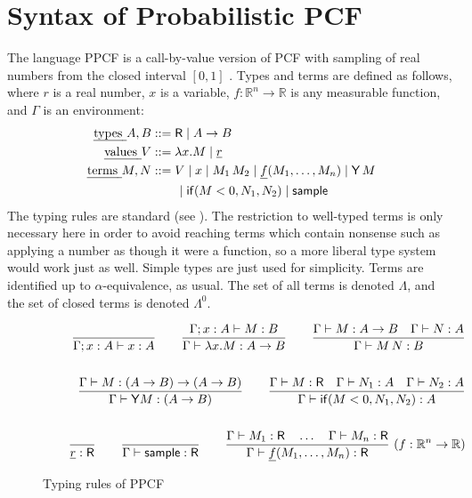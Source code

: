 \section{Syntax of Probabilistic PCF}
\label{sec:PPCF}

The language PPCF is a call-by-value version of PCF with sampling of real numbers from the closed interval $[0,1]$ \cite{Ehrhard2018c,DBLP:journals/pacmpl/EhrhardPT18,MakOPW21}.
Types and terms are defined as follows, where $r$ is a real number, $x$ is a variable, $f : \mathbb{R}^n \to \mathbb{R}$ is any measurable function, and $\Gamma$ is an environment:
\begin{align*}
  \text{\em types } A, B &::= \textsf{R}  \mid  A \to B \\
  \text{\em values } V &::= \lambda x.M  \mid  \underline{r} \\
  \text{\em terms } M, N &::= V  \mid  x  \mid  M_1 \, M_2  \mid  \underline{f}(M_1,\dots ,M_n)  \mid  \mathsf{Y} \, M \\
   & \qquad \mid  \mathsf{if}(M < 0, N_1, N_2)  \mid  \mathsf{sample}
\end{align*}
The typing rules are standard (see ). The restriction to well-typed terms is only necessary here in order to avoid reaching terms which contain nonsense such as applying a number as though it were a function, so a more liberal type system would work just as well. Simple types are just used for simplicity.
Terms are identified up to $\alpha$-equivalence, as usual. 
The set of all terms is denoted $\Lambda$, and the set of closed terms is denoted $\Lambda^0$.

\begin{figure*}[htb]
\begin{align*}
  \frac{}{\Gamma ; x:A \vdash x:A} 
  \qquad
  \frac{\Gamma ; x:A \vdash M : B}{\Gamma \vdash \lambda x.M : A \to B} 
  \qquad
  \frac{\Gamma \vdash M:A \to B \quad \Gamma \vdash N : A}{\Gamma \vdash M \, N : B} 
  \\ \\
  \qquad
  \frac{\Gamma \vdash M : (A \to B) \to (A \to B)}{\Gamma \vdash \mathsf{Y} M : (A \to B)}
  \qquad
  \frac{\Gamma \vdash M : \textsf{R} \quad \Gamma \vdash N_1 : A \quad \Gamma \vdash N_2 : A}{\Gamma \vdash \mathsf{if}(M < 0, N_1, N_2) : A}    
  \\ \\
  \qquad
  \frac{}{\underline{r} : \textsf{R}} 
  \qquad
  \frac{}{\Gamma \vdash \mathsf{sample} : \textsf{R}}
  \qquad
  \frac{\Gamma \vdash M_1:\textsf{R} \quad \dots \quad \Gamma \vdash M_n:\textsf{R}}{\Gamma \vdash \underline{f}(M_1,\dots,M_n) : \textsf{R}} \ (f : \mathbb{R}^n \to \mathbb{R})
\end{align*}
\caption{Typing rules of PPCF \label{fig:typing rules}}
\end{figure*}

